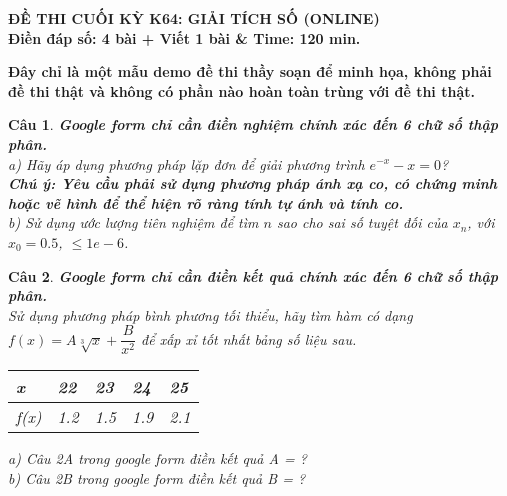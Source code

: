 \documentclass[11pt]{article}
\newtheorem{bt}{Câu}
\begin{document}


\begin{center}
	\textbf{ĐỀ THI CUỐI KỲ K64: GIẢI TÍCH SỐ (ONLINE) \\ Điền đáp số: 4 bài + Viết 1 bài \quad \& \quad Time: 120 min.} 
\begin{shaded}
\textbf{Đây chỉ là một mẫu demo đề thi thầy soạn để minh họa, không phải đề thi thật và không có phần nào hoàn toàn trùng với đề thi thật.
}
\end{shaded}
\end{center}

\begin{bt} \textbf{Google form chỉ cần điền nghiệm chính xác đến 6 chữ số thập phân.} \\
a) Hãy áp dụng phương pháp lặp đơn để giải phương trình $e^{-x} - x  = 0 $? \\ \textbf{Chú ý: Yêu cầu phải sử dụng phương pháp ánh xạ co, có chứng minh hoặc vẽ hình để thể hiện rõ ràng tính tự ánh và tính co.} \\
b) Sử dụng ước lượng tiên nghiệm để tìm $n$ sao cho sai số tuyệt đối của $x_n$, với $x_0 = 0.5$,
$\leq 1e-6$.
\end{bt}


\begin{bt} \textbf{Google form chỉ cần điền kết quả chính xác đến 6 chữ số thập phân.} \\
Sử dụng phương pháp bình phương tối thiểu, hãy tìm hàm có dạng $f(x) = A \sqrt[3]{x}+ \dfrac{B}{x^2}$ để xấp xỉ tốt nhất bảng số liệu sau. 
\begin{center}
	\begin{tabular}[5]{l|l|l|l|l}
		x    & 22  &  23  &  24  &  25 \\ \hline
		f(x) & 1.2 & 1.5  & 1.9  & 2.1
	\end{tabular}	
\end{center}
% 
a) Câu 2A trong google form điền kết quả A = ? \\
b) Câu 2B trong google form điền kết quả B = ? \\
\end{bt}
\end{document}
